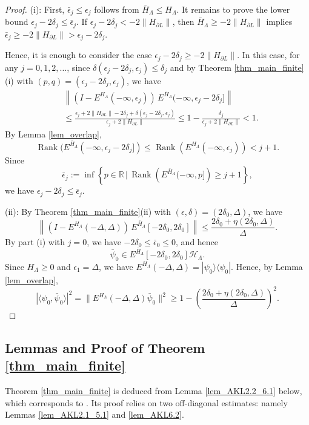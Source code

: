 \documentclass[11pt]{article}
\numberwithin{equation}{section}
\begin{document}
\begin{proof}
(i): First, $\bar{\epsilon}_j\leq\epsilon_j$ follows from $\bar{H}_\Lambda\leq H_\Lambda$. It remains to prove the lower bound $\epsilon_j-2\delta_j\leq\bar{\epsilon}_j$. If $\epsilon_j-2\delta_j<-2\|H_{\partial L}\|$, then $\bar{H}_\Lambda\geq-2\|H_{\partial L}\|$ implies $\bar{\epsilon}_j\geq-2\|H_{\partial L}\|>\epsilon_j-2\delta_j$. 

Hence, it is enough to consider the case $\epsilon_j-2\delta_j\geq -2\|H_{\partial L}\|$. In this case, for any $j=0,1,2,\ldots$, since $\delta(\epsilon_j-2\delta_j,\epsilon_j)\leq \delta_j$ and by Theorem \ref{thm_main_finite}(i) with $(p,q)=(\epsilon_j-2\delta_j,\epsilon_j)$, we have
\begin{align*}
&\left\|\left(I-E^{H_\Lambda}(-\infty,\epsilon_j)\right)\,
E^{\bar{H}_\Lambda}(-\infty,\epsilon_j-2\delta_j]\right\|\\
&\leq\frac{\epsilon_j+2\|H_{\partial L}\|-2\delta_j+\delta(\epsilon_j-2\delta_j,\epsilon_j)}{\epsilon_j+2\|H_{\partial L}\|}
\leq 1-\frac{\delta_j}{\epsilon_j+2\|H_{\partial L}\|}<1.
\end{align*}
By Lemma \ref{lem_overlap},
\[
\operatorname{Rank}(E^{\bar{H}_\Lambda}(-\infty,\epsilon_j-2\delta_j])\leq \operatorname{Rank}(E^{H_\Lambda}(-\infty,\epsilon_j))<j+1.
\]
Since
\[
\bar{\epsilon}_j:=\inf\left\{p\in\mathbb{R} \,|\, \operatorname{Rank} \left(E^{\bar{H}_\Lambda}(-\infty,p]\right)\geq j+1\right\},
\]
we have $\epsilon_j-2\delta_j\leq\bar{\epsilon}_j$.

(ii): By Theorem \ref{thm_main_finite}(ii) with $(\epsilon,\delta)=(2\delta_0,\Delta)$, we have
\[
\left\|\left(I-E^{H_\Lambda}(-\Delta,\Delta)\right)\,
E^{\bar{H}_\Lambda}[-2\delta_0,2\delta_0]\right\|
\leq \frac{2\delta_0+\eta(2\delta_0,\Delta)}{\Delta}.
\]
By part (i) with $j=0$, we have $-2\delta_0\leq \bar{\epsilon}_0\leq 0$, and hence 
\[
\bar{\psi}_0\in E^{\bar{H}_\Lambda}[-2\delta_0,2\delta_0]\mathcal H_\Lambda.
\]
Since $H_\Lambda\geq0$ and $\epsilon_1=\Delta$, we have
\(E^{H_\Lambda}(-\Delta,\Delta)=|\psi_0\rangle\langle\psi_0|\).
Hence, by Lemma \ref{lem_overlap},
\[
|\langle\psi_0,\bar{\psi}_0\rangle|^2
=\|E^{H_\Lambda}(-\Delta,\Delta) \bar{\psi}_0\|^2
\geq 1-
\left(\frac{2\delta_0+\eta(2\delta_0,\Delta)}{\Delta}\right)^2.
\]
\end{proof}

\subsection{Lemmas and Proof of Theorem \ref{thm_main_finite}}
Theorem \ref{thm_main_finite} is deduced from Lemma \ref{lem_AKL2.2_6.1} below, which corresponds to \cite[Theorem 2.2 and Theorem 6.1]{Arad-Kuwahara-Landau 2016}. Its proof relies on two off-diagonal estimates: namely Lemmas \ref{lem_AKL2.1_5.1} and \ref{lem_AKL6.2}.
\end{document}
